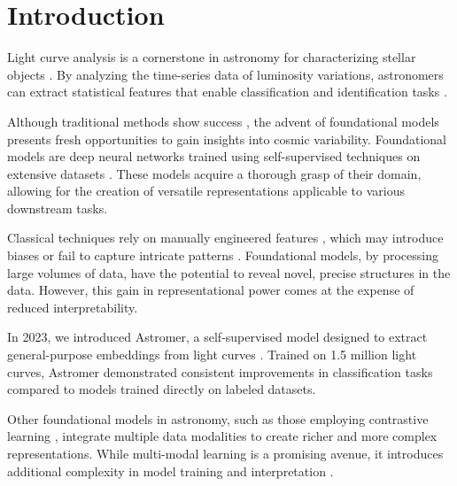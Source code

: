 \section{Introduction}
Light curve analysis is a cornerstone in astronomy for characterizing stellar objects \citep{deb2009light}. By analyzing the time-series data of luminosity variations, astronomers can extract statistical features that enable classification and identification tasks \citep{richards2011machine}.

Although traditional methods show success \citep{sanchez2021alert, chaini2024light}, the advent of foundational models presents fresh opportunities to gain insights into cosmic variability. Foundational models are deep neural networks trained using self-supervised techniques on extensive datasets \citep{bommasani2021opportunities, awais2023foundational}. These models acquire a thorough grasp of their domain, allowing for the creation of versatile representations applicable to various downstream tasks.

Classical techniques rely on manually engineered features \citep{debosscher2007automated, nun2015fats}, which may introduce biases or fail to capture intricate patterns \citep{2022MNRAS.517.3660P}. Foundational models, by processing large volumes of data, have the potential to reveal novel, precise structures in the data. However, this gain in representational power comes at the expense of reduced interpretability. %

In 2023, we introduced Astromer, a self-supervised model designed to extract general-purpose embeddings from light curves 
\citep{astromer}. Trained on 1.5 million light curves, Astromer demonstrated consistent improvements in classification tasks compared to models trained directly on labeled datasets.

Other foundational models in astronomy, such as those employing contrastive learning \citep{lanusse2023astroclip, rizhko2024self, parker2024astroclip}, integrate multiple data modalities to create richer and more complex representations. While multi-modal learning is a promising avenue, it introduces additional complexity in model training and interpretation \citep{wang2024comprehensive}.

